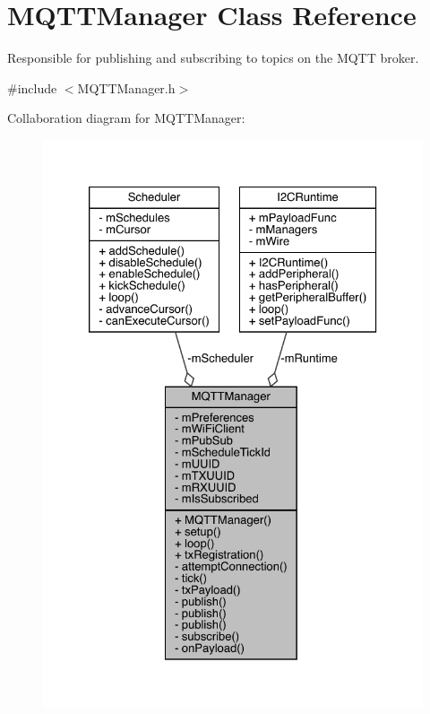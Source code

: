 \hypertarget{class_m_q_t_t_manager}{}\section{M\+Q\+T\+T\+Manager Class Reference}
\label{class_m_q_t_t_manager}


Responsible for publishing and subscribing to topics on the M\+Q\+TT broker.  




{\ttfamily \#include $<$M\+Q\+T\+T\+Manager.\+h$>$}



Collaboration diagram for M\+Q\+T\+T\+Manager\+:\nopagebreak
\begin{figure}[H]
\begin{center}
\leavevmode
\includegraphics[width=326pt]{class_m_q_t_t_manager__coll__graph}
\end{center}
\end{figure}
